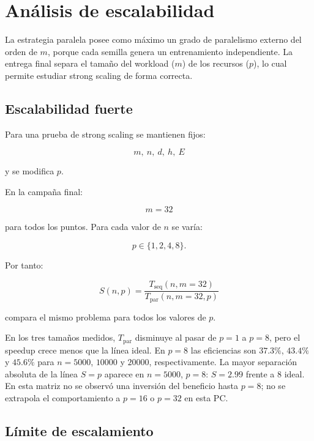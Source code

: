 \documentclass[11pt,a4paper]{article}
\begin{document}
\section{Análisis de escalabilidad}

La estrategia paralela posee como máximo un grado de paralelismo externo del orden de
$m$, porque cada semilla genera un entrenamiento independiente. La entrega final separa
el tamaño del workload ($m$) de los recursos ($p$), lo cual permite estudiar strong
scaling de forma correcta.

\subsection{Escalabilidad fuerte}

Para una prueba de strong scaling se mantienen fijos:

\begin{equation}
    m,\ n,\ d,\ h,\ E
\end{equation}

y se modifica $p$.

En la campaña final:

\begin{equation}
    m=32
\end{equation}

para todos los puntos. Para cada valor de $n$ se varía:

\begin{equation}
    p\in\{1,2,4,8\}.
\end{equation}

Por tanto:

\begin{equation}
    S(n,p)
    =
    \frac{T_{\mathrm{seq}}(n,m=32)}
         {T_{\mathrm{par}}(n,m=32,p)}
\end{equation}

compara el mismo problema para todos los valores de $p$.

En los tres tamaños medidos, $T_{\mathrm{par}}$ disminuye al pasar de $p=1$ a
$p=8$, pero el speedup crece menos que la línea ideal. En $p=8$ las eficiencias
son $37.3\%$, $43.4\%$ y $45.6\%$ para $n=5000$, $10000$ y $20000$,
respectivamente. La mayor separación absoluta de la línea $S=p$ aparece en
$n=5000$, $p=8$: $S=2.99$ frente a $8$ ideal. En esta matriz no se observó una
inversión del beneficio hasta $p=8$; no se extrapola el comportamiento a
$p=16$ o $p=32$ en esta PC.

\subsection{Límite de escalamiento}
\end{document}
